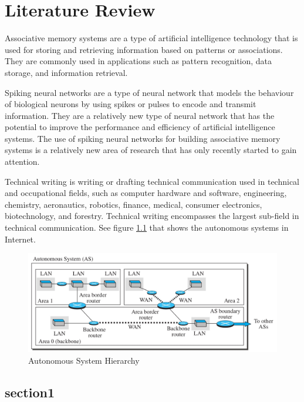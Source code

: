 \chapter{Literature Review}

Associative memory systems are a type of artificial intelligence technology
that is used for storing and retrieving information based on patterns or
associations. They are commonly used in applications such as pattern
recognition, data storage, and information retrieval.

Spiking neural networks are a type of neural network that models the behaviour
of biological neurons by using spikes or pulses to encode and transmit
information. They are a relatively new type of neural network that has the
potential to improve the performance and efficiency of artificial intelligence
systems. The use of spiking neural networks for building associative memory
systems is a relatively new area of research that has only recently started to
gain attention.

Technical\cite{base} writing is writing or drafting technical communication
used in technical and occupational fields\cite{india}, such as computer
hardware and software\cite{rpi}, engineering, chemistry, aeronautics, robotics,
finance\cite{japan}, medical, consumer electronics, biotechnology, and
forestry. Technical writing encompasses the largest sub-field in technical
communication. See figure \ref{net2} that shows the autonomous systems in
Internet.

\begin{figure}[h!]
	\centering
	\includegraphics[width=0.9\linewidth]{ospf}
	\caption{Autonomous System Hierarchy}
	\label{net2}
\end{figure}

\section{section1}
\lipsum[2] %

